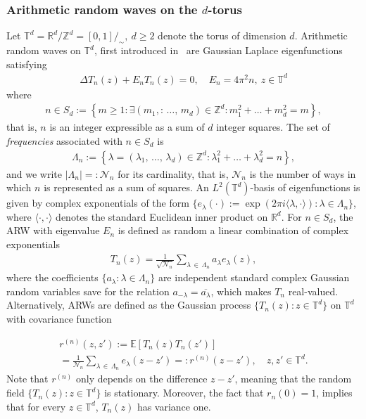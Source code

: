 \documentclass[10pt]{amsart}
\theoremstyle{definition}\newtheorem{defi}[theo]{Definition}\newtheorem{rema}[theo]{Remark}\newtheorem{exam}[theo]{Example}\newtheorem{exem}[theo]{Example}\newtheorem{nota}[theo]{Notation}
\newcommand{\R}{\mathbb{R}}
\newcommand{\Z}{\mathbb{Z}}
\newcommand{\tor}[1]{\mathbb{T}^{#1}}
\newcommand{\E}[1]{\mathbb{E}\left[#1\right]}
\newcommand{\scal}[2]{\langle #1,#2\rangle}
\newcommand{\Nn}{\mathcal{N}_n}
\let\oldexists\exists
\renewcommand*{\exists}{\mathrel{\oldexists}}
\begin{document}
\subsubsection*{Arithmetic random waves on the $d$-torus}
Let $\tor{d}=\R^d/\Z^d=[0,1]/_{\sim}, \ d\geq2$ denote the torus of dimension $d$. Arithmetic random waves on $\tor{d}$, first introduced in~\cite{ORW08,RW08} are Gaussian Laplace eigenfunctions satisfying
\begin{gather*}
\Delta T_n(z) + E_n T_n(z) = 0, \quad E_n=4\pi^2 n, \ z \in \tor{d}
\end{gather*}
where
\begin{gather*}
n \in S_d:=\left\{ m\geq 1: \exists (m_1,:\,\ldots,\,m_d)\in \Z^d: m_1^2+\ldots+m_d^2=m\right\},
\end{gather*}
that is, $n$ is an integer expressible as a sum of $d$ integer squares. The set of \emph{frequencies} associated with $n\in S_d$ is
\begin{gather*}
\Lambda_n:=\left\{ \lambda=(\lambda_1,\,\ldots,\,\lambda_d)\in \Z^d: \lambda_1^2+\ldots+\lambda_d^2=n\right\},
\end{gather*}
and we write $|\Lambda_n|=:\Nn$ for its cardinality, that is, $\Nn$ is the number of ways in which $n$ is represented as a sum of squares. An $L^2(\tor{d})$-basis of eigenfunctions is given by complex exponentials of the form $\{e_{\lambda}(\cdot):=\exp(2\pi i \scal{\lambda}{\cdot}):\lambda\in \Lambda_n\}$, where $\scal{\cdot}{\cdot}$ denotes the standard Euclidean inner product on $\R^d$. For $n \in S_d$, the ARW with eigenvalue $E_n$ is defined as random a linear combination of complex exponentials
\begin{gather}\label{Tn}
T_n(z) = \frac{1}{\sqrt{\Nn}} \sum_{\lambda\,\in\,\Lambda_n} a_{\lambda}e_{\lambda}(z),
\end{gather}
where the coefficients $\{a_{\lambda}:\lambda\in \Lambda_n\}$ are independent standard complex Gaussian random variables save for the relation $a_{-\lambda}=\overline{a_{\lambda}}$, which makes $T_n$ real-valued. Alternatively, ARWs are defined as the Gaussian process $\{T_n(z):z \in \tor{d}\}$ on $\tor{d}$ with covariance function

\begin{multline}\label{rn}
r^{(n)}(z,z'):=\E{T_n(z)T_n(z')} \\
= \frac{1}{\Nn}\sum_{\lambda\,\in\, \Lambda_n} e_{\lambda}(z-z')=:r^{(n)}(z-z'), \quad z,z' \in \tor{d}.
\end{multline}
Note that $r^{(n)}$ only depends on the difference $z-z'$, meaning that the random field $\{T_n(z): z \in \tor{d}\}$ is stationary. Moreover, the fact that $r_n(0)=1$, implies that for every $z\in \tor{d}$, $T_n(z)$ has variance one.
\end{document}
